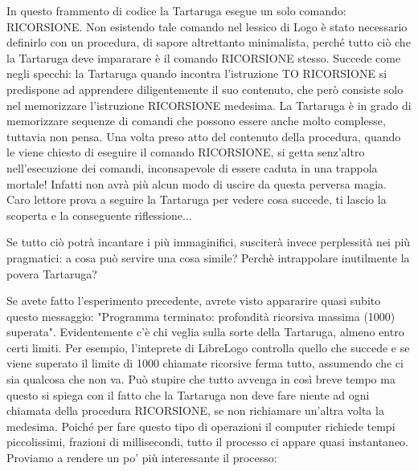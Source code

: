 In questo frammento di codice la Tartaruga esegue un solo comando: RICORSIONE. Non esistendo tale comando nel lessico di Logo è stato necessario definirlo con un procedura, di sapore altrettanto minimalista, perché tutto ciò che la Tartaruga deve impararare è il comando RICORSIONE stesso. Succede come negli specchi: la Tartaruga quando incontra l'istruzione TO RICORSIONE si predispone ad apprendere diligentemente il suo contenuto, che però consiste solo nel memorizzare l'istruzione RICORSIONE medesima. La Tartaruga è in grado di memorizzare sequenze di comandi che possono essere anche molto complesse, tuttavia non pensa. Una volta preso atto del contenuto della procedura, quando le viene chiesto di eseguire il comando RICORSIONE, si getta senz'altro nell'esecuzione dei comandi, inconsapevole di essere caduta in una trappola mortale! Infatti non avrà più alcun modo di uscire da questa perversa magia. Caro lettore prova a seguire la Tartaruga per vedere cosa succede, ti lascio la scoperta e la conseguente riflessione...

Se tutto ciò potrà incantare i più immaginifici, susciterà invece perplessità nei più pragmatici: a cosa può servire una cosa simile? Perchè intrappolare inutilmente la povera Tartaruga? 

Se avete fatto l'esperimento precedente, avrete visto appararire quasi subito questo messaggio: "Programma terminato: profondità ricorsiva massima (1000) superata". Evidentemente c'è chi veglia sulla sorte della Tartaruga, almeno entro certi limiti. Per esempio, l'inteprete di LibreLogo controlla quello che succede e se viene superato il limite di 1000 chiamate ricorsive ferma tutto, assumendo che ci sia qualcosa che non va. Può stupire che tutto avvenga in così breve tempo ma questo si spiega con il fatto che la Tartaruga non deve fare niente ad ogni chiamata della procedura RICORSIONE, se non richiamare un'altra volta la medesima. Poiché per fare questo tipo di operazioni il computer richiede tempi piccolissimi, frazioni di millisecondi, tutto il processo ci appare quasi instantaneo. Proviamo a rendere un po' più interessante il processo:

\vskip 1cm

